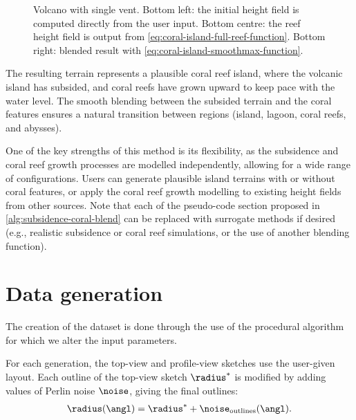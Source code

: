 \begin{figure}
    \caption[Volcano with coral reef generated using our curve-based method]{Volcano with single vent. Bottom left: the initial height field is computed directly from the user input. Bottom centre: the reef height field is output from \cref{eq:coral-island-full-reef-function}. Bottom right: blended result with \cref{eq:coral-island-smoothmax-function}.}
    \label{fig:coral-island-volcano-example}
\end{figure}

The resulting terrain represents a plausible coral reef island, where the volcanic island has subsided, and coral reefs have grown upward to keep pace with the water level. The smooth blending between the subsided terrain and the coral features ensures a natural transition between regions (island, lagoon, coral reefs, and abysses).

One of the key strengths of this method is its flexibility, as the subsidence and coral reef growth processes are modelled independently, allowing for a wide range of configurations. Users can generate plausible island terrains with or without coral features, or apply the coral reef growth modelling to existing height fields from other sources. Note that each of the pseudo-code section proposed in \cref{alg:subsidence-coral-blend} can be replaced with surrogate methods if desired (e.g., realistic subsidence or coral reef simulations, or the use of another blending function).


\section{Data generation}
\label{sec:coral-island-dataset-generation}

The creation of the dataset is done through the use of the procedural algorithm for which we alter the input parameters.

For each generation, the top-view and profile-view sketches use the user-given layout. Each outline of the top-view sketch $\radius^*$ is modified by adding values of Perlin noise $\noise$, giving the final outlines:
\begin{align*}
    \radius(\angl) = \radius^* + \noise_\text{outlines}(\angl).
\end{align*}

